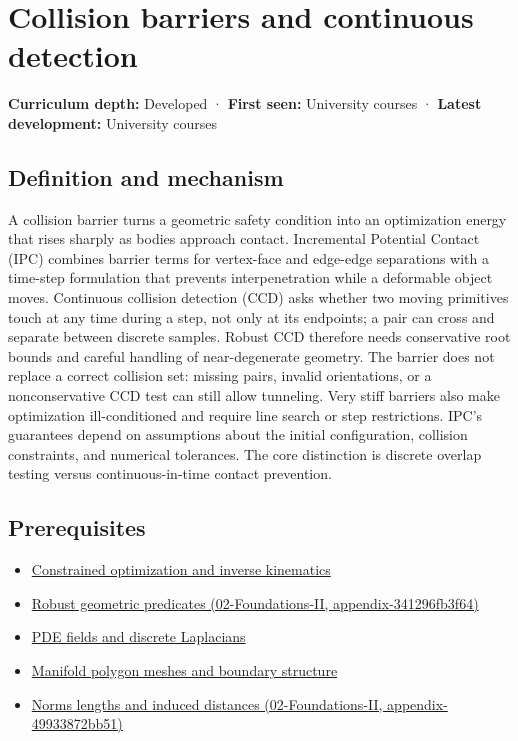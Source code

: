 \hypertarget{appendix-a9ba01fa72a6}{}
\section{Collision barriers and continuous detection}\label{appendix-a9ba01fa72a6-collision-barriers-and-continuous-detection}

\textbf{Curriculum depth:} Developed · \textbf{First seen:} University courses · \textbf{Latest development:} University courses

\subsection{Definition and mechanism}\label{appendix-a9ba01fa72a6-definition-and-mechanism}

A collision barrier turns a geometric safety condition into an optimization energy that rises sharply as bodies approach contact. Incremental Potential Contact (IPC) combines barrier terms for vertex-face and edge-edge separations with a time-step formulation that prevents interpenetration while a deformable object moves. Continuous collision detection (CCD) asks whether two moving primitives touch at any time during a step, not only at its endpoints; a pair can cross and separate between discrete samples. Robust CCD therefore needs conservative root bounds and careful handling of near-degenerate geometry. The barrier does not replace a correct collision set: missing pairs, invalid orientations, or a nonconservative CCD test can still allow tunneling. Very stiff barriers also make optimization ill-conditioned and require line search or step restrictions. IPC's guarantees depend on assumptions about the initial configuration, collision constraints, and numerical tolerances. The core distinction is discrete overlap testing versus continuous-in-time contact prevention.

\subsection{Prerequisites}\label{appendix-a9ba01fa72a6-prerequisites}

\begin{itemize}
\tightlist
\item
  \hyperref[appendix-29f4bea4c2bb]{Constrained optimization and inverse kinematics}
\item
  \href{../02-Foundations-II/main.pdf\#nameddest=appendix-341296fb3f64}{Robust geometric predicates (02-Foundations-II, appendix-341296fb3f64)}
\item
  \hyperref[appendix-1988d465c119]{PDE fields and discrete Laplacians}
\item
  \hyperref[appendix-fab348609369]{Manifold polygon meshes and boundary structure}
\item
  \href{../02-Foundations-II/main.pdf\#nameddest=appendix-49933872bb51}{Norms lengths and induced distances (02-Foundations-II, appendix-49933872bb51)}
\end{itemize}

